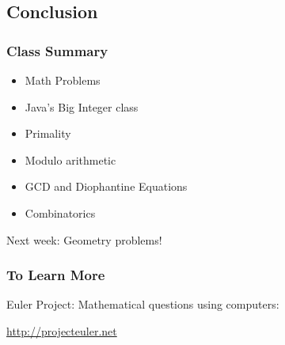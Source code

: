 \documentclass{beamer}
\begin{document}


\subsection{Conclusion}
\begin{frame}
  \frametitle{Class Summary}
  \begin{itemize}
  \item Math Problems
  \item Java's Big Integer class
  \item Primality
  \item Modulo arithmetic
  \item GCD and Diophantine Equations
  \item Combinatorics
  \end{itemize}

  \begin{block}{}
    Next week: Geometry problems!
  \end{block}
\end{frame}



\begin{frame}
  \frametitle{To Learn More}

  Euler Project: Mathematical questions using computers:

  \url{http://projecteuler.net}
\end{frame}
\end{document}
